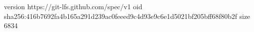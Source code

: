 version https://git-lfs.github.com/spec/v1
oid sha256:416b7692fa4b165a291d239ac0feeed9c4d93e9c6e1d5021bf205bff68f80b2f
size 6834

